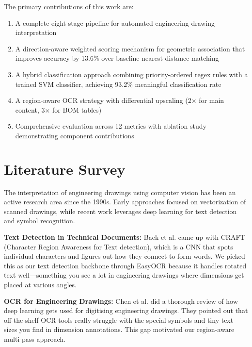 \documentclass[12pt,a4paper]{article}
\begin{document}
The primary contributions of this work are:
\begin{enumerate}[noitemsep]
    \item A complete eight-stage pipeline for automated engineering drawing interpretation
    \item A direction-aware weighted scoring mechanism for geometric association that improves accuracy by 13.6\% over baseline nearest-distance matching
    \item A hybrid classification approach combining priority-ordered regex rules with a trained SVM classifier, achieving 93.2\% meaningful classification rate
    \item A region-aware OCR strategy with differential upscaling (2$\times$ for main content, 3$\times$ for BOM tables)
    \item Comprehensive evaluation across 12 metrics with ablation study demonstrating component contributions
\end{enumerate}


\section{Literature Survey}

The interpretation of engineering drawings using computer vision has been an active research area since the 1990s. Early approaches focused on vectorization of scanned drawings, while recent work leverages deep learning for text detection and symbol recognition.

\textbf{Text Detection in Technical Documents:} Baek et al. \cite{baek2019craft} came up with CRAFT (Character Region Awareness for Text detection), which is a CNN that spots individual characters and figures out how they connect to form words. We picked this as our text detection backbone through EasyOCR because it handles rotated text well---something you see a lot in engineering drawings where dimensions get placed at various angles.

\textbf{OCR for Engineering Drawings:} Chen et al. \cite{chen2025parsing} did a thorough review of how deep learning gets used for digitising engineering drawings. They pointed out that off-the-shelf OCR tools really struggle with the special symbols and tiny text sizes you find in dimension annotations. This gap motivated our region-aware multi-pass approach.
\end{document}
